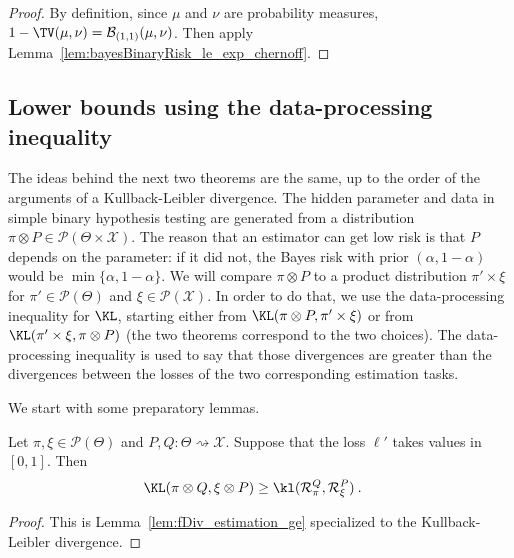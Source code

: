 \begin{proof}%
{}
By definition, since $\mu$ and $\nu$ are probability measures, $1 - \TV(\mu, \nu) = \mathcal B_{(1,1)}(\mu, \nu)$. Then apply Lemma~\ref{lem:bayesBinaryRisk_le_exp_chernoff}.
\end{proof}



\subsection{Lower bounds using the data-processing inequality}

The ideas behind the next two theorems are the same, up to the order of the arguments of a Kullback-Leibler divergence.
The hidden parameter and data in simple binary hypothesis testing are generated from a distribution $\pi \otimes P \in \mathcal P(\Theta \times \mathcal X)$.
The reason that an estimator can get low risk is that $P$ depends on the parameter: if it did not, the Bayes risk with prior $(\alpha, 1 - \alpha)$ would be $\min\{\alpha, 1 - \alpha\}$.
We will compare $\pi \otimes P$ to a product distribution $\pi' \times \xi$ for $\pi' \in \mathcal P(\Theta)$ and $\xi \in \mathcal P(\mathcal X)$.
In order to do that, we use the data-processing inequality for $\KL$, starting either from $\KL(\pi \otimes P, \pi' \times \xi)$ or from $\KL(\pi' \times \xi, \pi \otimes P)$ (the two theorems correspond to the two choices).
The data-processing inequality is used to say that those divergences are greater than the divergences between the losses of the two corresponding estimation tasks.

We start with some preparatory lemmas.


\begin{lemma}
  \label{lem:kl_estimation_ge}
  Let $\pi, \xi \in \mathcal P(\Theta)$ and $P, Q : \Theta \rightsquigarrow \mathcal X$. Suppose that the loss $\ell'$ takes values in $[0,1]$. Then
  \begin{align*}
  \KL(\pi \otimes Q, \xi \otimes P)
  &\ge \kl(\mathcal R_\pi^Q, \mathcal R_\xi^P)
  \: .
  \end{align*}
\end{lemma}

\begin{proof}%
{}
This is Lemma~\ref{lem:fDiv_estimation_ge} specialized to the Kullback-Leibler divergence.
\end{proof}


